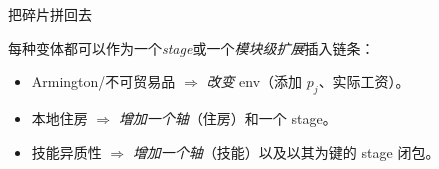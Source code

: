 \documentclass[10pt,aspectratio=169]{beamer}
\begin{document}
\begin{frame}{把碎片拼回去}

每种变体都可以作为一个\emph{stage}或一个\emph{模块级扩展}插入链条：

\vspace{0.3em}

\begin{itemize}
  \item Armington/不可贸易品 $\Rightarrow$ \emph{改变} env（添加 $p_j$、实际工资）。
  \item 本地住房 $\Rightarrow$ \emph{增加一个轴}（住房）和一个 stage。
  \item 技能异质性 $\Rightarrow$ \emph{增加一个轴}（技能）以及以其为键的 stage 闭包。
\end{itemize}

\end{frame}
\end{document}
